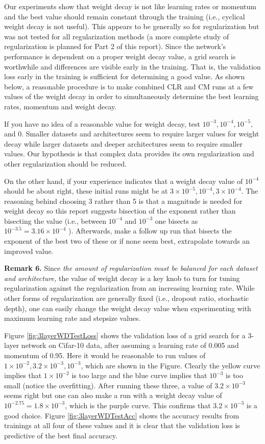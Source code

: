 \documentclass{article} %
\begin{document}
Our experiments show that weight decay is not like learning rates or momentum and the best value should remain constant through the training (i.e., cyclical weight decay is not useful). This appears to be generally so for regularization but was not tested for all regularization methods (a more complete study of regularization is planned for Part 2 of this report).  Since the network's performance is dependent on a proper weight decay value, a grid search is worthwhile and differences are visible early in the training.  That is, the validation loss early in the training is sufficient for determining a good value.  As shown below, a reasonable procedure is to make combined CLR and CM runs at a few values of the weight decay in order to simultaneously determine the best learning rates, momentum and weight decay. 

If you have no idea of a reasonable value for weight decay, test $ 10^{-3},  10^{-4},  10^{-5},$ and 0. Smaller datasets and architectures seem to require larger values for weight decay while larger datasets and deeper architectures seem to require smaller values.  Our hypothesis is that complex data provides its own regularization and other regularization should be reduced.    

On the other hand, if your experience indicates that a weight decay value of $10^{-4}$ should be about right, these initial runs might be at $3 \times 10^{-5},  10^{-4}, 3 \times 10^{-4}$.  The reasoning behind choosing 3 rather than 5 is that a magnitude is needed for weight decay so this report suggests bisection of the exponent rather than bisecting the value (i.e., between $10^{-4}$ and $10^{-3}$ one bisects as $ 10^{-3.5} = 3.16 \times 10^{-4}$ ). Afterwards, make a follow up run that bisects the exponent of the best two of these or if none seem best, extrapolate towards an improved value.

\textbf{Remark 6.}
Since  \emph{the amount of regularization must be balanced for each dataset and architecture,} the value of weight decay is a key knob to turn for tuning regularization against the regularization from an increasing learning rate.  While other forms of regularization are generally fixed (i.e., dropout ratio, stochastic depth), one can easily change the weight decay value when experimenting with maximum learning rate and stepsize values.

Figure \ref{fig:3layerWDTestLoss} shows the validation loss of a grid search for a 3-layer network on Cifar-10 data, after assuming a learning rate of 0.005 and momentum of 0.95.  Here it would be reasonable to run values of $1 \times 10^{-2}, 3.2 \times  10^{-3}, 10^{-3}$, which are shown in the Figure.  Clearly the yellow curve implies that $1 \times 10^{-2} $ is too large and the blue curve implies that $10^{-3}$ is too small (notice the overfitting).  After running these three, a value of $ 3.2 \times  10^{-3}$ seems right but one can also make a run with a weight decay value of  $10^{-2.75} = 1.8 \times  10^{-3}$, which is the purple curve.  This confirms  that $ 3.2 \times  10^{-3}$ is a good choice.   Figure \ref{fig:3layerWDTestAcc} shows the accuracy results from trainings at all four of these values and it is clear that the validation loss is predictive of the best final accuracy.
\end{document}
